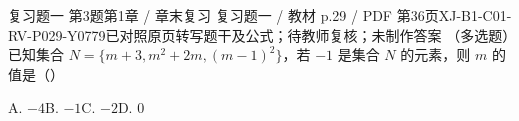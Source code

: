 \par\noindent\begin{minipage}{\linewidth}
\begin{bankitem}{复习题一 第3题}{第1章 / 章末复习 复习题一 / 教材 p.29 / PDF 第36页}{XJ-B1-C01-RV-P029-Y0779}{已对照原页转写题干及公式；待教师复核；未制作答案}
（多选题）已知集合 $N=\{m+3,m^2+2m,(m-1)^2\}$，若 $-1$ 是集合 $N$ 的元素，则 $m$ 的值是（\quad）
\par A. $-4$\qquad B. $-1$\qquad C. $-2$\qquad D. $0$
\end{bankitem}
\end{minipage}\par\medskip
